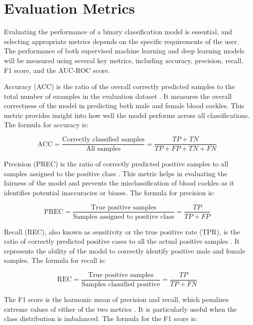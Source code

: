 \section{Evaluation Metrics}
Evaluating the performance of a binary classification model is essential, and selecting appropriate metrics depends on the specific requirements of the user. The performance of both supervised machine learning and deep learning models will be measured using several key metrics, including accuracy, precision, recall, F1 score, and the AUC-ROC score.

Accuracy (ACC) is the ratio of the overall correctly predicted samples to the total number of examples in the evaluation dataset \cite{cui2020}. It measures the overall correctness of the model in predicting both male and female blood cockles. This metric provides insight into how well the model performs across all classifications. The formula for accuracy is: 

\begin{equation}
	\text{ACC} = \frac{\text{Correctly classified samples}}{\text{All samples}} = \frac{TP + TN}{TP + FP + TN + FN}
	\label{eq:acc}
\end{equation}

Precision (PREC) is the ratio of correctly predicted positive samples to all samples assigned to the positive class \cite{cui2020}. This metric helps in evaluating the fairness of the model and prevents the misclassification of blood cockles as it identifies potential inaccuracies or biases. The formula for precision is:

\begin{equation}
	\text{PREC} = \frac{\text{True positive samples}}{\text{Samples assigned to positive class}} = \frac{TP}{TP + FP}
	\label{eq:prec}
\end{equation}

Recall (REC), also known as sensitivity or the true positive rate (TPR), is the ratio of correctly predicted positive cases to all the actual positive samples \cite{cui2020}. It represents the ability of the model to correctly identify positive male and female samples. The formula for recall is:

\begin{equation}
	\text{REC} = \frac{\text{True positive samples}}{\text{Samples classified positive}} = \frac{TP}{TP + FN}
	\label{eq:rec}
\end{equation}

The F1 score is the harmonic mean of precision and recall, which penalizes extreme values of either of the two metrics \cite{cui2020}. It is particularly useful when the class distribution is imbalanced. The formula for the F1 score is:

